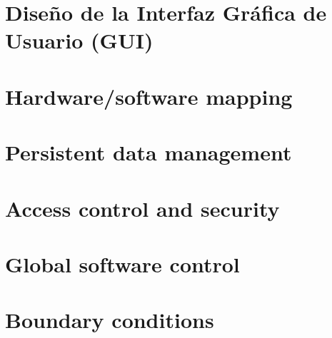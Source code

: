 \documentclass[a4paper,12pt]{article}
\begin{document}
    \section{Diseño de la Interfaz Gráfica de Usuario (GUI)}\label{sec:diseno-de-la-interfaz-grafica-de-usuario-(gui)}
    

    \section{Hardware/software mapping}


    \section{Persistent data management} %


    \section{Access control and security} %


    \section{Global software control} %


    \section{Boundary conditions} %
\end{document}
